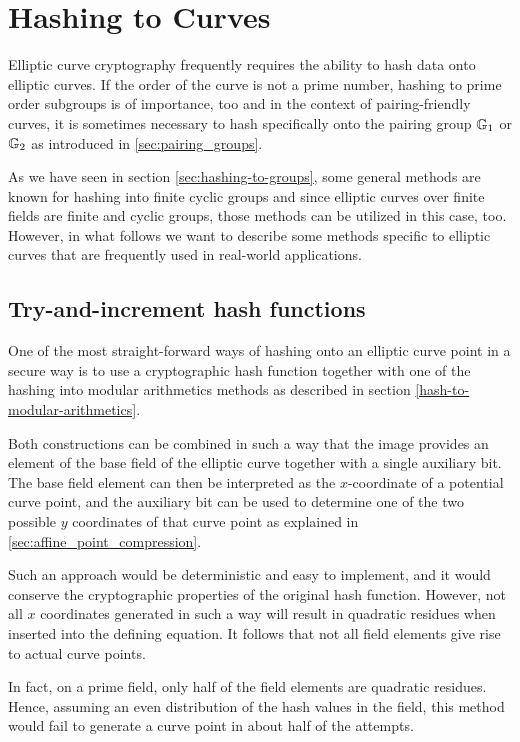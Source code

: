 
\section{Hashing to Curves} Elliptic curve cryptography frequently requires the ability to hash data onto elliptic curves. If the order of the curve is not a prime number, hashing to prime order subgroups is of importance, too and in the context of pairing-friendly curves, it is sometimes necessary to hash specifically onto the pairing group $\mathbb{G}_1$ or $\mathbb{G}_2$ as introduced in \ref{sec:pairing_groups}.

As we have seen in section \ref{sec:hashing-to-groups}, some general methods are known for hashing into finite cyclic groups and since elliptic curves over finite fields are finite and cyclic groups, those methods can be utilized in this case, too. However, in what follows we want to describe some methods specific to elliptic curves that are frequently used in real-world applications. 

\subsection{Try-and-increment hash functions}
One of the most straight-forward ways of hashing onto an elliptic curve point in a secure way is to use a cryptographic hash function together with one of the hashing into modular arithmetics methods as described in section \ref{hash-to-modular-arithmetics}.

Both constructions can be combined in such a way that the image provides an element of the base field of the elliptic curve together with a single auxiliary bit. The base field element can then be interpreted as the $x$-coordinate of a potential curve point, and the auxiliary bit can be used to determine one of the two possible $y$ coordinates of that curve point as explained in \ref{sec:affine_point_compression}.

Such an approach would be deterministic and easy to implement, and it would conserve the cryptographic properties of the original hash function. However, not all $x$ coordinates generated in such a way will result in quadratic residues when inserted into the defining equation. It follows that not all field elements give rise to actual curve points. 

In fact,
on a prime field, only half of the field elements are quadratic residues. Hence, assuming an even distribution of the hash values in the field, this method would fail to generate a curve point in about half of the attempts. 


